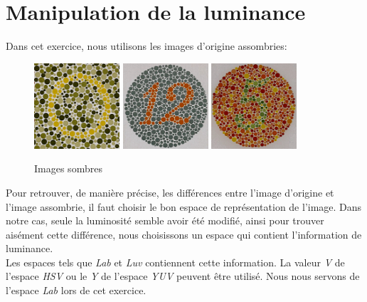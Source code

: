 \documentclass[a4paper,11pt]{article}
\begin{document}
\section{Manipulation de la luminance}

Dans cet exercice, nous utilisons les images d'origine assombries:

\begin{figure}[H]
  \begin{center}
    \includegraphics[width=120px]{images/it1_72pp_sombre.png}
    \includegraphics[width=120px]{images/it2_72pp_sombre.png}
    \includegraphics[width=120px]{images/it3_72pp_sombre.png}
    \caption{Images sombres}
  \end{center}
\end{figure}

Pour retrouver, de manière précise, les différences entre l'image 
d'origine et l'image assombrie, il faut choisir le bon espace de
représentation de l'image. Dans notre cas, seule la luminosité 
semble avoir été modifié, ainsi pour trouver aisément cette 
différence, nous choisissons un espace qui contient l'information de 
luminance.\\

Les espaces tels que \textit{Lab} et \textit{Luv} contiennent cette 
information. La valeur \textit{V} de l'espace \textit{HSV} ou le 
\textit{Y} de l'espace \textit{YUV} peuvent être utilisé. Nous 
nous servons de l'espace \textit{Lab} lors de cet exercice.\\
\end{document}

